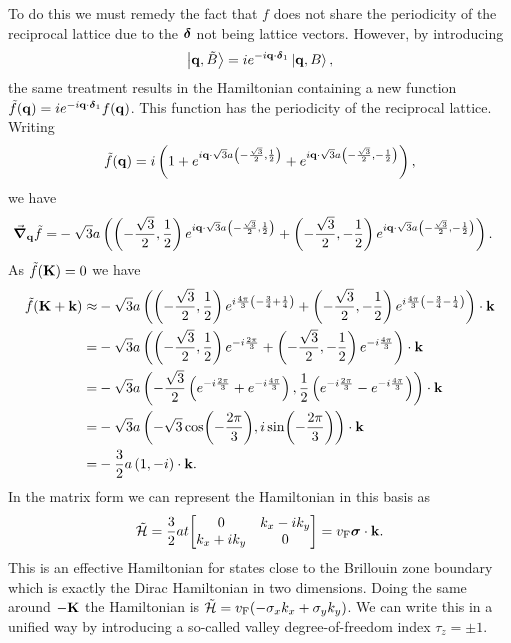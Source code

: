 To do this we must remedy the fact that $f$ does not share the periodicity of the reciprocal lattice due to the $\vb*{\delta}$ not being lattice vectors. However, by introducing
\begin{align*}
	\ket{\vb{q}, \tilde{B}} = ie^{-i\vb{q}\cdot\vb*{\delta}_{1}}\ket{\vb{q}, B},
\end{align*}
the same treatment results in the Hamiltonian containing a new function $\tilde{f}(\vb{q}) = ie^{-i\vb{q}\cdot\vb*{\delta}_{1}}f(\vb{q})$. This function has the periodicity of the reciprocal lattice. Writing
\begin{align*}
	\tilde{f}(\vb{q}) = i\left(1 + e^{i\vb{q}\cdot\sqrt{3}a\left(-\frac{\sqrt{3}}{2}, \frac{1}{2}\right)} + e^{i\vb{q}\cdot\sqrt{3}a\left(-\frac{\sqrt{3}}{2}, -\frac{1}{2}\right)}\right),
\end{align*}
we have
\begin{align*}
	\grad_{\vb{q}}\tilde{f} =& -\sqrt{3}a\left(\left(-\frac{\sqrt{3}}{2}, \frac{1}{2}\right)e^{i\vb{q}\cdot\sqrt{3}a\left(-\frac{\sqrt{3}}{2}, \frac{1}{2}\right)} + \left(-\frac{\sqrt{3}}{2}, -\frac{1}{2}\right)e^{i\vb{q}\cdot\sqrt{3}a\left(-\frac{\sqrt{3}}{2}, -\frac{1}{2}\right)}\right).
\end{align*}
As $\tilde{f}(\vb{K}) = 0$ we have
\begin{align*}
	\tilde{f}(\vb{K} + \vb{k}) \approx& -\sqrt{3}a\left(\left(-\frac{\sqrt{3}}{2}, \frac{1}{2}\right)e^{i\frac{4\pi}{3}\left(-\frac{3}{4} + \frac{1}{4}\right)} + \left(-\frac{\sqrt{3}}{2}, -\frac{1}{2}\right)e^{i\frac{4\pi}{3}\left(-\frac{3}{4} - \frac{1}{4}\right)}\right)\cdot\vb{k} \\
	=& -\sqrt{3}a\left(\left(-\frac{\sqrt{3}}{2}, \frac{1}{2}\right)e^{-i\frac{2\pi}{3}} + \left(-\frac{\sqrt{3}}{2}, -\frac{1}{2}\right)e^{-i\frac{4\pi}{3}}\right)\cdot\vb{k} \\
	=& -\sqrt{3}a\left(-\frac{\sqrt{3}}{2}\left(e^{-i\frac{2\pi}{3}} + e^{-i\frac{4\pi}{3}}\right), \frac{1}{2}\left(e^{-i\frac{2\pi}{3}} - e^{-i\frac{4\pi}{3}}\right)\right)\cdot\vb{k} \\
	=& -\sqrt{3}a\left(-\sqrt{3}\cos(-\frac{2\pi}{3}), i\sin(-\frac{2\pi}{3})\right)\cdot\vb{k} \\
	=& -\frac{3}{2}a\left(1, -i\right)\cdot\vb{k}.
\end{align*}
In the matrix form we can represent the Hamiltonian in this basis as
\begin{align*}
	\tilde{\ham} = \frac{3}{2}at\mqty[
		0               & k_{x} - ik_{y} \\
		k_{x} + ik_{y}  & 0 \\
	] = v_{\text{F}}\vb*{\sigma}\cdot\vb{k}.
\end{align*}
This is an effective Hamiltonian for states close to the Brillouin zone boundary which is exactly the Dirac Hamiltonian in two dimensions. Doing the same around $-\vb{K}$ the Hamiltonian is $\tilde{\mathcal{H}} = v_{\text{F}}(-\sigma_{x}k_{x} + \sigma_{y}k_{y})$. We can write this in a unified way by introducing a so-called valley degree-of-freedom index $\tau_{z} = \pm 1$.